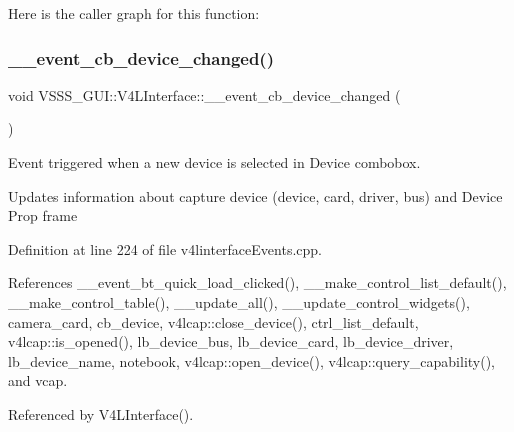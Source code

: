 Here is the caller graph for this function\+:
\mbox{\label{class_v_s_s_s___g_u_i_1_1_v4_l_interface_af38c88f726a7ff9fab089ab9ed20c03c}} 
\subsubsection{\texorpdfstring{\+\_\+\+\_\+event\+\_\+cb\+\_\+device\+\_\+changed()}{\_\_event\_cb\_device\_changed()}}
{\footnotesize\ttfamily void V\+S\+S\+S\+\_\+\+G\+U\+I\+::\+V4\+L\+Interface\+::\+\_\+\+\_\+event\+\_\+cb\+\_\+device\+\_\+changed (\begin{DoxyParamCaption}{ }\end{DoxyParamCaption})}



Event triggered when a new device is selected in Device combobox. 

Updates information about capture device (device, card, driver, bus) and Device Prop frame 

Definition at line 224 of file v4linterface\+Events.\+cpp.



References \+\_\+\+\_\+event\+\_\+bt\+\_\+quick\+\_\+load\+\_\+clicked(), \+\_\+\+\_\+make\+\_\+control\+\_\+list\+\_\+default(), \+\_\+\+\_\+make\+\_\+control\+\_\+table(), \+\_\+\+\_\+update\+\_\+all(), \+\_\+\+\_\+update\+\_\+control\+\_\+widgets(), camera\+\_\+card, cb\+\_\+device, v4lcap\+::close\+\_\+device(), ctrl\+\_\+list\+\_\+default, v4lcap\+::is\+\_\+opened(), lb\+\_\+device\+\_\+bus, lb\+\_\+device\+\_\+card, lb\+\_\+device\+\_\+driver, lb\+\_\+device\+\_\+name, notebook, v4lcap\+::open\+\_\+device(), v4lcap\+::query\+\_\+capability(), and vcap.



Referenced by V4\+L\+Interface().


